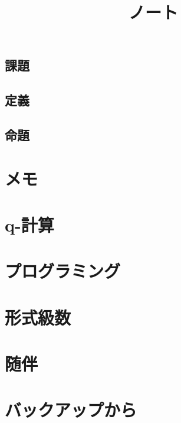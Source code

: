 \documentclass[5pt]{jreport}
\title{ノート}
\author{}
\begin{document}
\maketitle
\tableofcontents
\section*{課題}
\section*{定義}
\section*{命題}

\chapter{メモ}



\chapter{q-計算}

%
\chapter{プログラミング}


\chapter{形式級数}

\chapter{随伴}

\chapter{バックアップから}




\end{document}
